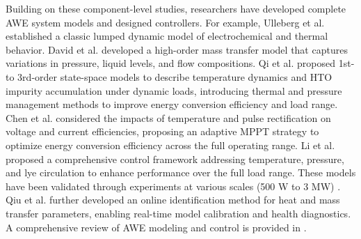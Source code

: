 \documentclass[review,3p,10pt]{elsarticle}
\begin{document}
Building on these component-level studies, researchers have developed complete AWE system models %
and designed controllers. %
For example, Ulleberg et al. \cite{ulleberg2003modeling} established a classic lumped dynamic model of electrochemical and thermal behavior. David et al. \cite{david2020dynamic} developed a high-order mass transfer model that captures variations in pressure, liquid levels, and flow compositions. Qi et al. \cite{qi2023thermal,qi2023design,qi2021pressure} proposed 1st- to 3rd-order state-space models to describe temperature dynamics and HTO impurity accumulation under dynamic loads, introducing thermal and pressure management methods to improve energy conversion efficiency and load range. 
Chen et al. \cite{cheng2024self} considered the impacts of temperature and pulse rectification on voltage and current efficiencies, proposing an adaptive MPPT strategy to optimize energy conversion efficiency across the full operating range. 
Li et al. \cite{li2022active} proposed a comprehensive control framework addressing temperature, pressure, and lye circulation to enhance performance over the full load range. These models have been validated through experiments at various scales (500 W to 3 MW) \cite{li2022study,ding2023experimental,sakas2022dynamic}. Qiu et al. \cite{qiu2023dynamic} further developed an online identification method for heat and mass transfer parameters, enabling real-time model calibration and health diagnostics. %
A comprehensive review of AWE modeling and control is provided in \cite{olivier2017low,daoudi2024overview,aguirre2024control}.
\end{document}
